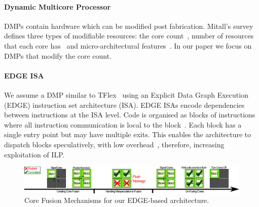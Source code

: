 \paragraph{Dynamic Multicore Processor} DMPs contain hardware which can be modified post fabrication.
Mitall's survey ~\cite{MittalSurv2016} defines three types of modifiable resources: the core count~\cite{ipek2007CoreFusion}, number of resources that each core has~\cite{Homayoun3DPooling2012} and micro-architectural features~\cite{fallinhetblock2014,BauerRSE08,tavanaElastic}.
In our paper we focus on DMPs that modify the core count.

\paragraph{EDGE ISA} We assume a DMP similar to TFlex~\cite{kim2007tflex} using an Explicit Data Graph Execution~\cite{burger04edge} (EDGE) instruction set architecture (ISA).
EDGE ISAs encode dependencies between instructions at the ISA level.
Code is organised as blocks of instructions where all instruction communication is local to the block~\cite{smith2006edge}.
Each block has a single entry point but may have multiple exits.
This enables the architecture to dispatch blocks speculatively, with low overhead~\cite{putnam2010e2,kim2007tflex}, therefore, increasing exploitation of ILP.

 \begin{figure}[t]
 \center
 \includegraphics[width=1\textwidth]{cases-paper/graphics/background/proc_test.pdf}
\vspace*{-5mm}
 \caption{Core Fusion Mechanisms for our EDGE-based architecture.}\label{fig:dmp}
\vspace{-5mm}
 \end{figure}
